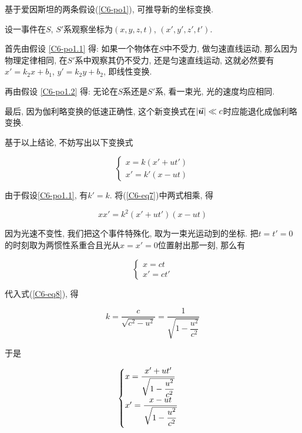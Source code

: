 基于爱因斯坦的两条假设(\ref{C6-po1}), 可推导新的坐标变换. 

设一事件在$S$, $S'$系观察坐标为$(x, y, z, t)$, $(x', y', z', t')$. 

首先由假设 \ref{C6-po1.1} 得: 如果一个物体在$S$中不受力, 做匀速直线运动, 那么因为物理定律相同, 在$S'$系中观察其仍不受力, 还是匀速直线运动, 这就必然要有$x' = k_2x + b_1$, $y' = k_2y + b_2$, 即线性变换. 

再由假设 \ref{C6-po1.2} 得: 无论在$S$系还是$S'$系, 看一束光, 光的速度均应相同. 

最后, 因为伽利略变换的低速正确性, 这个新变换式在$\abs{\va*{u}} \ll c$时应能退化成伽利略变换. 

基于以上结论, 不妨写出以下变换式

\begin{equation}
	\begin{cases}
		x = k(x' + ut') \\
		x' = k'(x - ut)
	\end{cases}
    \label{C6-eq7}
\end{equation}

由于假设\ref{C6-po1.1}, 有$k' = k$. 将(\ref{C6-eq7})中两式相乘, 得

\begin{equation}
	xx' = k^2 (x' + ut') (x - ut) \label{C6-eq8}
\end{equation}

因为光速不变性, 我们把这个事件特殊化, 取为一束光运动到的坐标. 把$t = t' = 0$的时刻取为两惯性系重合且光从$x = x' = 0$位置射出那一刻, 那么有

\begin{equation}
	\begin{cases}
		x = ct \\
		x' = ct'
	\end{cases}
    \label{C6-eq9}
\end{equation}

代入式(\ref{C6-eq8}), 得

\begin{equation}
	k = \dfrac{c}{\sqrt{c^2 - u^2}} = \dfrac{1}{\sqrt{1 - \dfrac{u^2}{c^2}}} \label{C6-eq10}
\end{equation}

\newpage

于是

\begin{equation}
	\begin{cases}
		x = \dfrac{x' + ut'}{\sqrt{1 - \dfrac{u^2}{c^2}}} \\ \vspace{1ex}
		x' = \dfrac{x - ut}{\sqrt{1 - \dfrac{u^2}{c^2}}}
	\end{cases}
    \label{C6-eq11}
\end{equation}


